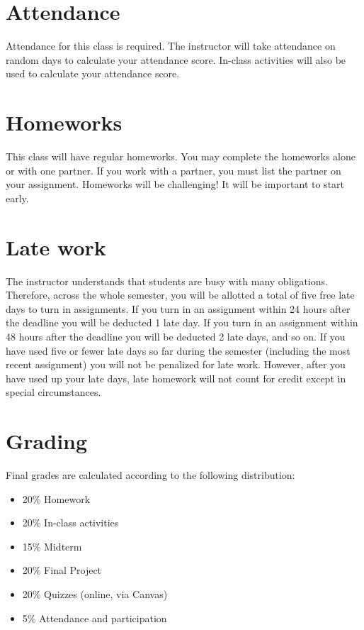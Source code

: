\documentclass[10pt]{memoir}
\begin{document}
\section{\textbf{Attendance}}
Attendance for this class is required. The instructor will take attendance on random days to calculate your attendance score. In-class activities will also be used to calculate your attendance score.

\section{\textbf{Homeworks}}
This class will have regular homeworks. You may complete the homeworks alone or with one partner. If you work with a partner, you must list the partner on your assignment. Homeworks will be challenging! It will be important to start early.

\section{\textbf{Late work}}
The instructor understands that students are busy with many obligations. Therefore, across the whole semester, you will be allotted a total of five free late days to turn in assignments. If you turn in an assignment within 24 hours after the deadline you will be deducted 1 late day. If you turn in an assignment within 48 hours after the deadline you will be deducted 2 late days, and so on. If you have used five or fewer late days so far during the semester (including the most recent assignment) you will not be penalized for late work. However, after you have used up your late days, late homework will not count for credit except in special circumstances.

\section{\textbf{Grading}}

Final grades are calculated according to the following distribution:
\begin{itemize}
\item 20\% Homework
\item 20\% In-class activities
\item 15\% Midterm
\item 20\% Final Project
\item 20\% Quizzes (online, via Canvas)
\item 5\% Attendance and participation
\end{itemize}
\end{document}
